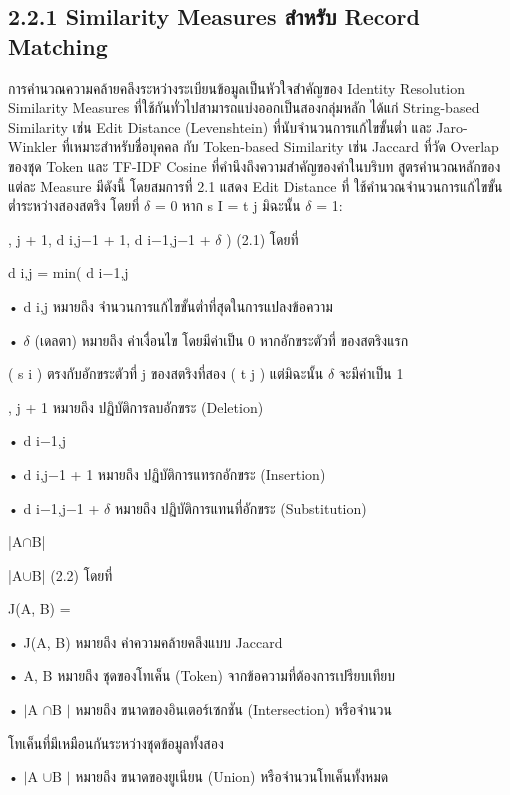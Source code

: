 \documentclass[12pt,a4paper]{report}
\begin{document}
\subsection*{2.2.1 Similarity Measures สำหรับ Record Matching}
การคำนวณความคล้ายคลึงระหว่างระเบียนข้อมูลเป็นหัวใจสำคัญของ Identity Resolution Similarity Measures ที่ใช้กันทั่วไปสามารถแบ่งออกเป็นสองกลุ่มหลัก ได้แก่ String-based Similarity เช่น Edit Distance (Levenshtein) ที่นับจำนวนการแก้ไขขั้นต่ำ และ Jaro-Winkler ที่เหมาะสำหรับชื่อบุคคล กับ Token-based Similarity เช่น Jaccard ที่วัด Overlap ของชุด Token และ TF-IDF Cosine ที่คำนึงถึงความสำคัญของคำในบริบท สูตรคำนวณหลักของแต่ละ Measure มีดังนี้ โดยสมการที่ 2.1 แสดง Edit Distance ที่ ใช้คำนวณจำนวนการแก้ไขขั้นต่ำระหว่างสองสตริง โดยที่ \ensuremath{\delta} = 0 หาก s I = t j มิฉะนั้น \ensuremath{\delta} = 1:\par
, j + 1, d i,j−1 + 1, d i−1,j−1 + \ensuremath{\delta} ) (2.1) โดยที่\par
d i,j = min( d i−1,j\par
\noindent • d i,j หมายถึง จำนวนการแก้ไขขั้นต่ำที่สุดในการแปลงข้อความ\par
\noindent • \ensuremath{\delta} (เดลตา) หมายถึง ค่าเงื่อนไข โดยมีค่าเป็น 0 หากอักขระตัวที่ ของสตริงแรก\par
( s i ) ตรงกับอักขระตัวที่ j ของสตริงที่สอง ( t j ) แต่มิฉะนั้น \ensuremath{\delta} จะมีค่าเป็น 1\par
, j + 1 หมายถึง ปฏิบัติการลบอักขระ (Deletion)\par
\noindent • d i−1,j\par
\noindent • d i,j−1 + 1 หมายถึง ปฏิบัติการแทรกอักขระ (Insertion)\par
\noindent • d i−1,j−1 + \ensuremath{\delta} หมายถึง ปฏิบัติการแทนที่อักขระ (Substitution)\par
|A\ensuremath{\cap}B|\par
|A\ensuremath{\cup}B| (2.2) โดยที่\par
J(A, B) =\par
\clearpage
\noindent • J(A, B) หมายถึง ค่าความคล้ายคลึงแบบ Jaccard\par
\noindent • A, B หมายถึง ชุดของโทเค็น (Token) จากข้อความที่ต้องการเปรียบเทียบ\par
\noindent • \ensuremath{\mid}A \ensuremath{\cap}B \ensuremath{\mid} หมายถึง ขนาดของอินเตอร์เซกชัน (Intersection) หรือจำนวน\par
โทเค็นที่มีเหมือนกันระหว่างชุดข้อมูลทั้งสอง\par
\noindent • \ensuremath{\mid}A \ensuremath{\cup}B \ensuremath{\mid} หมายถึง ขนาดของยูเนียน (Union) หรือจำนวนโทเค็นทั้งหมด\par
\end{document}
